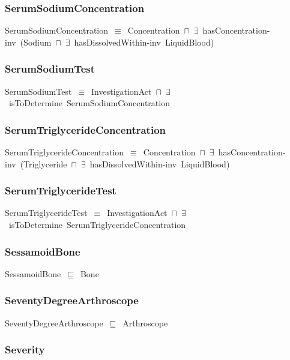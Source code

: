 \documentclass{article}
\begin{document}
\subsubsection*{SerumSodiumConcentration}

SerumSodiumConcentration~\ensuremath{\equiv}~Concentration~\ensuremath{\sqcap}~\ensuremath{\exists}~hasConcentration-inv~(Sodium~\ensuremath{\sqcap}~\ensuremath{\exists}~hasDissolvedWithin-inv~LiquidBlood)

\subsubsection*{SerumSodiumTest}

SerumSodiumTest~\ensuremath{\equiv}~InvestigationAct~\ensuremath{\sqcap}~\ensuremath{\exists}~isToDetermine~SerumSodiumConcentration

\subsubsection*{SerumTriglycerideConcentration}

SerumTriglycerideConcentration~\ensuremath{\equiv}~Concentration~\ensuremath{\sqcap}~\ensuremath{\exists}~hasConcentration-inv~(Triglyceride~\ensuremath{\sqcap}~\ensuremath{\exists}~hasDissolvedWithin-inv~LiquidBlood)

\subsubsection*{SerumTriglycerideTest}

SerumTriglycerideTest~\ensuremath{\equiv}~InvestigationAct~\ensuremath{\sqcap}~\ensuremath{\exists}~isToDetermine~SerumTriglycerideConcentration

\subsubsection*{SessamoidBone}

SessamoidBone~\ensuremath{\sqsubseteq}~Bone~

\subsubsection*{SeventyDegreeArthroscope}

SeventyDegreeArthroscope~\ensuremath{\sqsubseteq}~Arthroscope~

\subsubsection*{Severity}
\end{document}
